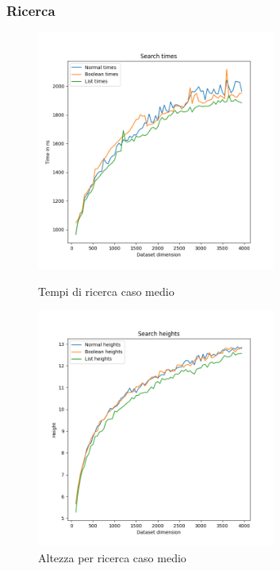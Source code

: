 \subsubsection{Ricerca}

\begin{figure}[H]
  \centering
  \begin{minipage}{.5\textwidth}
    \centering
    \includegraphics[width=0.7\textwidth]{Resources/ABR_Resources/SearchTimes.png}
    \caption{Tempi di ricerca caso medio}
    \label{fig:STimes}
  \end{minipage}%
  \hfil %
  \begin{minipage}{.5\textwidth}
    \centering
    \includegraphics[width=0.7\textwidth]{Resources/ABR_Resources/SearchHeights.png}
    \caption{Altezza per ricerca caso medio}
    \label{fig:SHeights}
  \end{minipage}%
\end{figure}

